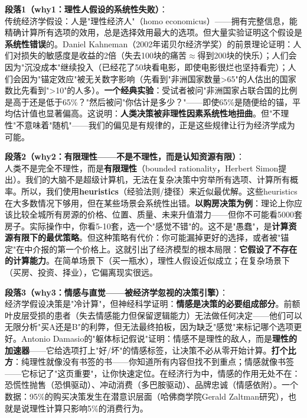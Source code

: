 \documentclass[../main.tex]{subfiles}
\begin{document}
	\textbf{段落1（why1：理性人假设的系统性失败）}：\\
	传统经济学假设：人是"理性经济人"（homo economicus）——拥有完整信息，能精确计算所有选项的效用，总是选择效用最大的选项。但大量实验证明这个假设是\textbf{系统性错误}的。Daniel Kahneman（2002年诺贝尔经济学奖）的前景理论证明：人们对损失的敏感度是收益的2倍（失去100块的痛苦$\approx$得到200块的快乐）；人们会因为"沉没成本"继续投入（已经花了50块看电影，即使电影很烂也坚持看完）；人们会因为"锚定效应"被无关数字影响（先看到"非洲国家数量>65"的人估出的国家数比先看到">10"的人多）。\textbf{一个经典实验}：受试者被问"非洲国家占联合国的比例是高于还是低于65\%？"然后被问"你估计是多少？"——即使65\%是随便给的锚，平均估计值也显著偏高。这说明：\textbf{人类决策被非理性因素系统性地扭曲}。但"不理性"不意味着"随机"——我们的偏见是有规律的，正是这些规律让行为经济学成为可能。

	\textbf{段落2（why2：有限理性——不是不理性，而是认知资源有限）}：\\
	人类不是完全不理性，而是\textbf{有限理性}（bounded rationality，Herbert Simon提出）。我们的大脑不是超级计算机，无法在复杂决策中穷举所有选项、计算所有概率。所以，我们使用\textbf{heuristics}（经验法则/捷径）来近似最优解。这些heuristics在大多数情况下够用，但在某些场景会系统性出错。\textbf{以购房决策为例}：理论上你应该比较全城所有房源的价格、位置、质量、未来升值潜力——但你不可能看5000套房子。实际操作中，你看5-10套，选一个"感觉不错"的。这不是"愚蠢"，是\textbf{计算资源有限下的最优策略}。但这种策略有代价：你可能漏掉更好的选择，或者被"锚定"在中介报的第一个价格上。这就引出了经济模型的根本局限：\textbf{它假设了不存在的计算能力}。在简单场景下（买一瓶水），理性人假设近似成立；在复杂场景下（买房、投资、择业），它偏离现实很远。

	\textbf{段落3（why3：情感与直觉——被经济学忽视的决策引擎）}：\\
	经济学假设决策是"冷计算"，但神经科学证明：\textbf{情感是决策的必要组成部分}。前额叶皮层受损的患者（失去情感能力但保留逻辑能力）无法做任何决定——他们可以无限分析"买A还是B"的利弊，但无法最终拍板，因为缺乏"感觉"来标记哪个选项更好。Antonio Damasio的"躯体标记假说"证明：情感不是理性的敌人，而是\textbf{理性的加速器}——它给选项打上"好/坏"的情感标签，让决策不必从零开始计算。\textbf{打个比方}：纯理性就像没有书签的书——你知道所有内容但找不到重点；情感就像书签——它标记了"这页重要"，让你快速定位。在经济行为中，情感的作用无处不在：恐慌性抛售（恐惧驱动）、冲动消费（多巴胺驱动）、品牌忠诚（情感依附）。一个数据：95\%的购买决策发生在潜意识层面（哈佛商学院Gerald Zaltman研究），也就是说理性计算只影响5\%的消费行为。
\end{document}
